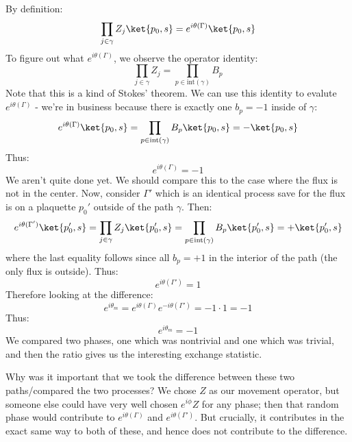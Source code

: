 By definition:
\begin{equation}
    \prod_{j \in \gamma}Z_j \ket{p_0, s} = e^{i\theta(\Gamma)}\ket{p_0, s}
\end{equation}
To figure out what $e^{i\theta(\Gamma)}$, we observe the operator identity:
\begin{equation}
    \prod_{j \in \gamma}Z_j = \prod_{p \in \text{int}(\gamma)}B_p
\end{equation}
Note that this is a kind of Stokes' theorem. We can use this identity to evalute $e^{i\theta(\Gamma)}$ - we're in business because there is exactly one $b_p = -1$ inside of $\gamma$:
\begin{equation}
    e^{i\theta(\Gamma)}\ket{p_0, s} = \prod_{p \in \text{int}(\gamma)}B_p\ket{p_0, s} = -\ket{p_0, s}
\end{equation}
Thus:
\begin{equation}
    e^{i\theta(\Gamma)} = -1
\end{equation}
We aren't quite done yet. We should compare this to the case where the flux is not in the center. Now, consider $\Gamma'$ which is an identical process save for the flux is on a plaquette $p_0'$ outside of the path $\gamma$. Then:
\begin{equation}
    e^{i\theta(\Gamma')}\ket{p_0', s} = \prod_{j \in \gamma}Z_j \ket{p_0', s} = \prod_{p \in \text{int}(\gamma)}B_p\ket{p_0', s} = +\ket{p_0', s}
\end{equation}
where the last equality follows since all $b_p = +1$ in the interior of the path (the only flux is outside). Thus:
\begin{equation}
    e^{i\theta(\Gamma')} = 1
\end{equation}
Therefore looking at the difference:
\begin{equation}
    e^{i\theta_m} = e^{i\theta(\Gamma)}e^{-i\theta(\Gamma')} = -1 \cdot 1 = -1
\end{equation}
Thus:
\begin{equation}
    \boxed{e^{i\theta_m} = -1}
\end{equation}
We compared two phases, one which was nontrivial and one which was trivial, and then the ratio gives us the interesting exchange statistic. 

Why was it important that we took the difference between these two paths/compared the two processes? We chose $Z$ as our movement operator, but someone else could have very well chosen $e^{i\phi}Z$ for any phase; then that random phase would contribute to $e^{i\theta(\Gamma)}$ and $e^{i\theta(\Gamma')}$. But crucially, it contributes in the exact same way to both of these, and hence does not contribute to the difference.

